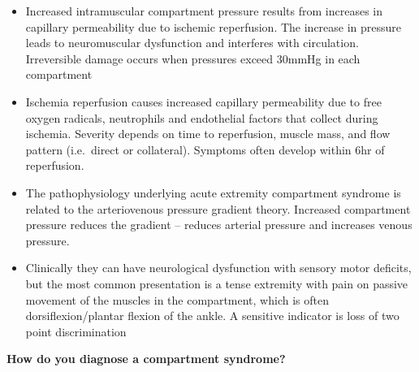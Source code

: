 \documentclass[
]{book}
\begin{document}
\begin{itemize}
\item
  Increased intramuscular compartment pressure results from increases
  in capillary permeability due to ischemic reperfusion. The increase
  in pressure leads to neuromuscular dysfunction and interferes with
  circulation. Irreversible damage occurs when pressures exceed 30mmHg
  in each compartment~~
\item
  Ischemia reperfusion causes increased capillary permeability due to
  free oxygen radicals, neutrophils and endothelial factors that
  collect during ischemia. Severity depends on time to reperfusion,
  muscle mass, and flow pattern (i.e.~direct or collateral). Symptoms
  often develop within 6hr of reperfusion. \citep{vonkeudell2015}
\item
  The pathophysiology underlying acute extremity compartment syndrome
  is related to the arteriovenous pressure gradient theory. Increased
  compartment pressure reduces the gradient -- reduces arterial
  pressure and increases venous pressure.\citep{frink2010, mcqueen1996, elliott2003, papalambros1989}
\item
  Clinically they can have neurological dysfunction with sensory motor
  deficits, but the most common presentation is a tense extremity with
  pain on passive movement of the muscles in the compartment, which is
  often dorsiflexion/plantar flexion of the ankle. A sensitive
  indicator is loss of two point discrimination
\end{itemize}

\textbf{How do you diagnose a compartment syndrome?}
\end{document}
